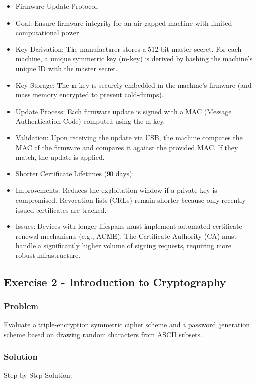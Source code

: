 \documentclass{article}
\begin{document}
\begin{itemize}
    \item[\textbf{1.}] Firmware Update Protocol:
    \item Goal: Ensure firmware integrity for an air-gapped machine with limited computational power.
    \item Key Derivation: The manufacturer stores a 512-bit master secret. For each machine, a unique symmetric key (m-key) is derived by hashing the machine's unique ID with the master secret.
    \item Key Storage: The m-key is securely embedded in the machine's firmware (and mass memory encrypted to prevent cold-dumps).
    \item Update Process: Each firmware update is signed with a MAC (Message Authentication Code) computed using the m-key.
    \item Validation: Upon receiving the update via USB, the machine computes the MAC of the firmware and compares it against the provided MAC. If they match, the update is applied.

    \item[\textbf{2.}] Shorter Certificate Lifetimes (90 days):
    \item Improvements: Reduces the exploitation window if a private key is compromised. Revocation lists (CRLs) remain shorter because only recently issued certificates are tracked.
    \item Issues: Devices with longer lifespans must implement automated certificate renewal mechanisms (e.g., ACME). The Certificate Authority (CA) must handle a significantly higher volume of signing requests, requiring more robust infrastructure.
\end{itemize}

\subsection{Exercise 2 - Introduction to Cryptography}
\subsubsection*{Problem}
Evaluate a triple-encryption symmetric cipher scheme and a password generation scheme based on drawing random characters from ASCII subsets.

\subsubsection*{Solution}
Step-by-Step Solution:
\end{document}

